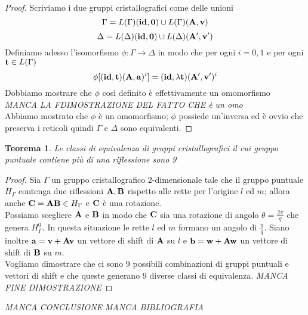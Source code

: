 \documentclass[a4paper,11pt,openright,twoside	]{book}
\newtheorem{theorem}{Teorema}[section]
\begin{document}
\begin{proof}
Scriviamo i due gruppi cristallografici come delle unioni
\[ \Gamma = L(\Gamma)(\vb{id, 0}) \cup L(\Gamma)(\vb{A, v}) \]
\[ \Delta = L(\Delta)(\vb{id, 0}) \cup L(\Delta)(\vb{A', v'})  \]
Definiamo adesso l'isomorfismo $\phi : \Gamma \longrightarrow \Delta$ in modo che per ogni $i = 0, 1$ e per ogni $\vb{t} \in L(\Gamma)$ 
\[ \phi[(\vb{id, t})(\vb{A, a})^i] = (\vb{id}, \lambda\vb{t})(\vb{A', v'})^i \]
Dobbiamo mostrare che $\phi$ così definito è effettivamente un omomorfismo \\
\emph{MANCA LA FDIMOSTRAZIONE DEL FATTO CHE è un omo} \\
Abbiamo mostrato che $\phi$ è un omomorfismo; $\phi$ possiede un'inversa ed è ovvio che preserva i reticoli quindi $\Gamma$ e $\Delta$ sono equivalenti.  
\end{proof}

\begin{theorem}
Le classi di equivalenza di gruppi cristallografici il cui gruppo puntuale contiene più di una riflessione sono 9
\end{theorem}

\begin{proof}
Sia $\Gamma$ un gruppo cristallografico $2$-dimensionale tale che il gruppo puntuale $H_{\Gamma}$ contenga due riflessioni $\vb{A}, \vb{B}$ rispetto alle rette per l'origine $l$ ed $m$; allora anche $\vb{C} = \vb{AB} \in H_{\Gamma}$ e $\vb{C}$ è una rotazione. \\
Possiamo scegliere $\vb{A}$ e  $\vb{B}$ in modo che $\vb{C}$ sia una rotazione di angolo $\theta = \frac{2 \pi}{q}$ che genera $H_{\Gamma}^0$. In questa situazione le rette $l$ ed $m$ formano un angolo di $\frac{\pi}{q}$. 
Siano inoltre $\vb{a} = \vb{v + Av}$ un vettore di shift di $\vb{A}$ su $l$ e $\vb{b} = \vb{w + Aw}$ un vettore di shift di $\vb{B}$ su $m$.\\
Vogliamo dimostrare che ci sono 9 possibili combinazioni di gruppi puntuali e vettori di shift e che queste generano 9 diverse classi di equivalenza. 
\emph{MANCA FINE DIMOSTRAZIONE}
\end{proof}

\emph{MANCA CONCLUSIONE}
\emph{MANCA BIBLIOGRAFIA}
\end{document}

